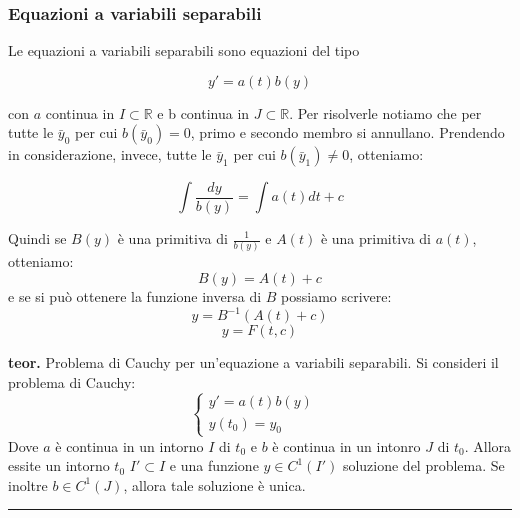 \subsubsection{Equazioni a variabili separabili}
Le equazioni a variabili separabili sono equazioni del tipo
\begin{tcolorbox}
\[
    y' =a(t) b(y)
\]
\end{tcolorbox}
con $a$ continua in $I \subset \mathbb{R}$ e b continua in $J \subset \mathbb{R}$.\newline
Per risolverle notiamo che per tutte le $\bar{y}_0$ per cui $b(\bar{y}_0) = 0$, primo e secondo membro si annullano.\newline
Prendendo in considerazione, invece, tutte le $\bar{y}_1$ per cui $b(\bar{y}_1) \neq 0$, otteniamo:
\begin{tcolorbox}
\[
    \int \frac{dy}{b(y)} = \int a(t) dt +c 
\]
\end{tcolorbox}
Quindi se $B(y)$ è una primitiva di $\frac{1}{b(y)}$ e $A(t)$ è una primitiva di $a(t)$, otteniamo:
\[
    B(y) = A(t) + c
\]
e se si può ottenere la funzione inversa di $B$ possiamo scrivere:
\[
    y = B^{-1}(A(t) + c)
\]
\[
    y = F(t,c)
\]
\begin{tcolorbox}
\textbf{teor.} Problema di Cauchy per un'equazione a variabili separabili.\newline
Si consideri il problema di Cauchy:
\[
    \begin{cases}
        y' = a(t) b(y)&\\
        y(t_0) = y_0&
    \end{cases}
\]
Dove $a$ è continua in un intorno $I$ di $t_0$ e $b$ è continua in un intonro $J$ di $t_0$. Allora essite un intorno $t_0$ $I' \subset I$ e una funzione $y \in C^1(I')$ soluzione del problema.\newline
Se inoltre $b \in C^1(J)$, allora tale soluzione è unica.\newline
\end{tcolorbox}
\rule{\textwidth}{0,4pt}
